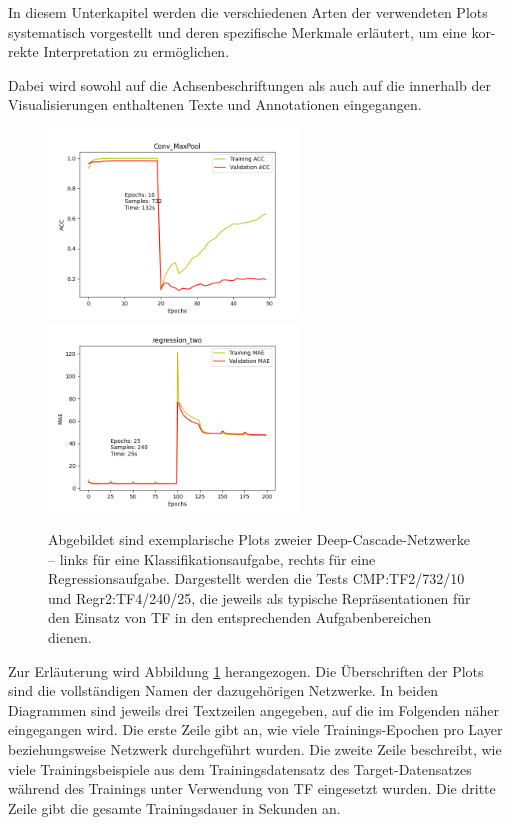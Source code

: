 In diesem Unterkapitel werden die verschiedenen Arten der verwendeten Plots systematisch vorgestellt und deren spezifische Merkmale erläutert, 
um eine kor-rekte Interpretation zu ermöglichen.

Dabei wird sowohl auf die Achsenbeschriftungen als auch auf die innerhalb der Visualisierungen enthaltenen Texte und Annotationen eingegangen.

\begin{figure}[htpb]
    \includegraphics[height=5cm]{../../Plots/ba_plots/convmaxpool/2TFtr.png}
    \includegraphics[height=5cm]{../../Plots/ba_plots/regr2/regr2train.png}
    \caption{\label{fig:ploterkl} 
    \small{Abgebildet sind exemplarische Plots zweier Deep-Cascade-Netzwerke – links für eine Klassifikationsaufgabe, rechts für eine 
    Regressionsaufgabe.
    Dargestellt werden die Tests CMP:TF2/732/10 und Regr2:TF4/240/25, die jeweils als typische Repräsentationen für den Einsatz von TF 
    in den entsprechenden Aufgabenbereichen dienen.}}
\end{figure}

Zur Erläuterung wird Abbildung \ref{fig:ploterkl} herangezogen. Die Überschriften der Plots sind die vollständigen Namen der dazugehörigen 
Netzwerke. In beiden Diagrammen sind jeweils drei Textzeilen angegeben, auf die im 
Folgenden näher eingegangen wird. Die erste Zeile gibt an, wie viele Trainings-Epochen pro Layer beziehungsweise Netzwerk durchgeführt wurden. 
Die zweite Zeile beschreibt, wie viele Trainingsbeispiele aus dem Trainingsdatensatz des Target-Datensatzes während des Trainings unter 
Verwendung von TF eingesetzt wurden. Die dritte Zeile gibt die gesamte Trainingsdauer in Sekunden an.

